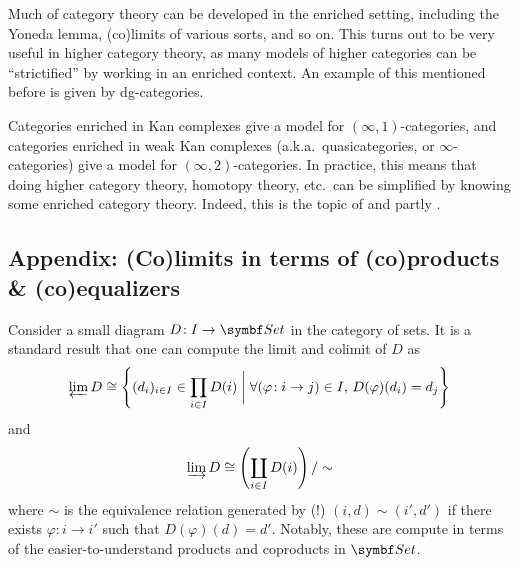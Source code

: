 Much of category theory can be developed in the enriched setting, including the Yoneda lemma, (co)limits of various sorts, and so on. This turns out to be very useful
in higher category theory, as many models of higher categories can be ``strictified'' by working in an enriched context. An example of this mentioned before is
given by dg-categories.

Categories enriched in Kan complexes give a model for \((\infty,1)\)-categories, and categories enriched in weak Kan complexes (a.k.a.\ quasicategories, or \(\infty\)-categories) give a model for \((\infty,2)\)-categories.
In practice, this means that doing higher category theory, homotopy theory, etc.\ can be simplified by knowing some enriched category theory. Indeed, this is the topic of
\cite{riehl-categorical-homotopy-theory} and partly \cite{riehl-verity-elements}.

\subsection{Appendix: (Co)limits in terms of (co)products \& (co)equalizers}
Consider a small diagram \(D\!:I\to\Set\) in the category of sets. It is a standard result that one can compute the limit and colimit of \(D\)
as
\[ \projlim{D} \cong \left\{ (d_i)_{i\in I}\in\prod_{i\in I}D(i)\bigmid \forall(\varphi\!:i\to j)\in I,\, D(\varphi)(d_i) = d_j \right\} \]
and
\[ \injlim{D} \cong \left(\coprod_{i\in I}D(i)\right) / \sim \]
where \(\sim\) is the equivalence relation generated by (!) \((i,d) \sim (i',d')\) if there exists \(\varphi\!:i\to i'\) such that \(D(\varphi)(d) = d'\).
Notably, these are compute in terms of the easier-to-understand products and coproducts in \(\Set\).

